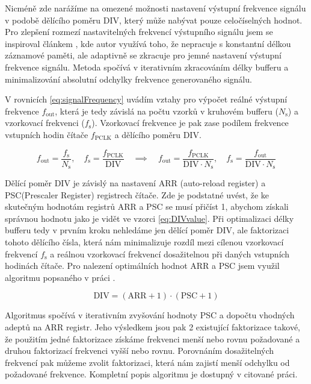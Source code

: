 Nicméně zde narážíme na omezené možnosti nastavení výstupní frekvence signálu v podobě dělícího poměru DIV, který může nabývat pouze celočíselných hodnot. Pro zlepšení rozmezí nastavitelných frekvencí výstupního signálu jsem se inspiroval článkem \cite{SDI_Hladik}, kde autor využívá toho, že nepracuje s konstantní délkou záznamové paměti, ale adaptivně se zkracuje pro jemné nastavení výstupní frekvence signálu. Metoda spočívá v iterativním zkracováním délky bufferu a minimalizování absolutní odchylky frekvence generovaného signálu.

V rovnicích \ref{eq:signalFrequency} uvádím vztahy pro výpočet reálné výstupní frekvence $f_{\text{out}}$, která je tedy závislá na počtu vzorků v kruhovém bufferu  ($N_\text{s}$) a vzorkovací frekvenci ($f_\text{s}$). Vzorkovací frekvence je pak zase podílem frekvence vstupních hodin čítače $f_{\text{PCLK}}$ a dělícího poměru DIV.
 
\begin{equation}
	f_{\text{out}}=\frac{f_{\text{s}}}{N_\text{s}},\quad  f_{\text{s}}=\frac{f_{\text{PCLK}}}{\text{DIV}} \quad \implies \quad f_{\text{out}}=\frac{f_{\text{PCLK}}}{\text{DIV}\cdot N_\text{s}}, \quad 
	f_{\text{s}}=\frac{f_{\text{out}}}{\text{DIV}\cdot N_\text{s}}
	\label{eq:signalFrequency}
\end{equation}

 Dělící poměr DIV je závislý na nastavení ARR (auto-reload register) a PSC(Prescaler Register) registrech čítače. Zde je podstatné uvést, že ke skutečným hodnotám registrů ARR a PSC se musí přičíst 1, abychom získali správnou hodnotu jako je vidět ve vzorci \ref{eq:DIVvalue}. Při optimalizaci délky bufferu tedy  v prvním kroku nehledáme jen dělící poměr DIV, ale faktorizaci tohoto dělícího čísla, která nám minimalizuje rozdíl mezi cílenou vzorkovací frekvencí $f_{\text{s}}$ a reálnou vzorkovací frekvencí dosažitelnou při daných vstupních hodinách čítače. Pro nalezení optimálních hodnot ARR a PSC jsem využil algoritmu popsaného v práci \cite{DujavaDIP}. 
  
  \begin{equation}
 	\text{DIV}=(\text{ARR}+1)\cdot(\text{PSC}+1)
 	\label{eq:DIVvalue}
 \end{equation}
 
 Algoritmus spočívá v iterativním zvyšování hodnoty PSC a dopočtu vhodných adeptů na ARR registr. Jeho výsledkem jsou pak 2 existující faktorizace takové, že použitím jedné faktorizace získáme frekvenci menší nebo rovnu požadované a druhou faktorizací frekvenci vyšší nebo rovnu. Porovnáním dosažitelných frekvencí pak můžeme zvolit faktorizaci, která nám zajistí menší odchylku od požadované frekvence. Kompletní popis algoritmu je dostupný v citované práci.
 
